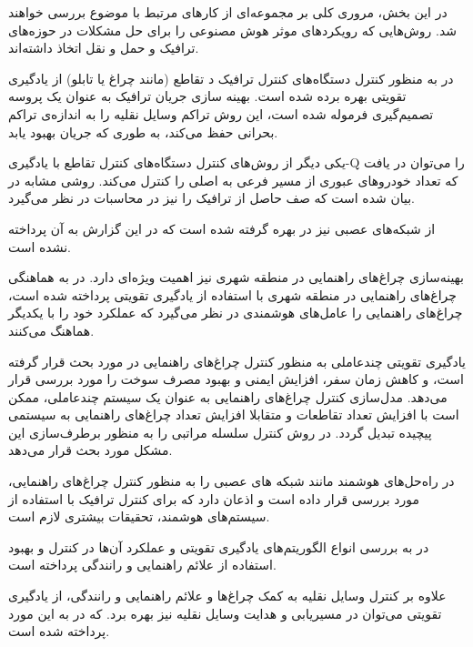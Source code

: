 

در این بخش، مروری کلی بر مجموعه‌ای از کارهای مرتبط با موضوع بررسی خواهند شد. روش‌هایی که رویکردهای موثر هوش مصنوعی را برای حل مشکلات در حوزه‌های ترافیک و حمل و نقل اتخاذ داشته‌اند.

در \cite{Fares2014} به منظور کنترل دستگاه‌های کنترل ترافیک د تقاطع (مانند چراغ یا تابلو) از یادگیری تقویتی بهره برده شده است. 
بهینه سازی جریان ترافیک به عنوان یک پروسه تصمیم‌گیری فرموله شده است، این روش تراکم وسایل نقلیه را به اندازه‌ی تراکم بحرانی حفظ می‌کند، به طوری که جریان بهبود یابد.

یکی دیگر از روش‌های کنترل دستگاه‌های کنترل تقاطع با یادگیری-Q را می‌توان در \cite{Rezaee2012} یافت که تعداد خودروهای عبوری از مسیر فرعی به اصلی را کنترل می‌کند.
روشی مشابه در \cite{Davarynejad2011} بیان شده است که صف حاصل از ترافیک را نیز در محاسبات در نظر می‌گیرد.

از شبکه‌های عصبی نیز در \cite{Wei2002} بهره گرفته شده است که در این گزارش به آن پرداخته نشده است.

بهینه‌سازی چراغ‌های راهنمایی در منطقه شهری نیز اهمیت ویژه‌ای دارد. در \cite{Kuyer2008} به هماهنگی چراغ‌های راهنمایی در منطقه شهری با استفاده از یادگیری تقویتی پرداخته شده است، چراغ‌های راهنمایی را عامل‌های هوشمندی در نظر می‌گیرد که عملکرد خود را با یکدیگر هماهنگ می‌کنند. 

یادگیری تقویتی چندعاملی به منظور کنترل چراغ‌های راهنمایی در \cite{Khamis2014,Khamis2012} مورد بحث قرار گرفته است، و کاهش زمان سفر، افزایش ایمنی و بهبود مصرف سوخت را مورد بررسی قرار می‌دهد. مدل‌سازی کنترل چراغ‌های راهنمایی به عنوان یک سیستم چندعاملی، ممکن است با افزایش تعداد تقاطعات و متقابلا افزایش تعداد چراغ‌های راهنمایی به سیستمی پیچیده تبدیل گردد. در \cite{Abdoos2013} روش کنترل سلسله مراتبی را به منظور برطرف‌سازی این مشکل مورد بحث قرار می‌دهد.

در \cite{Zhao2012} راه‌حل‌های هوشمند مانند شبکه های عصبی را به منظور کنترل چراغ‌های راهنمایی،  مورد بررسی قرار داده است و اذعان دارد که برای کنترل ترافیک با استفاده از سیستم‌های هوشمند، تحقیقات بیشتری لازم است.

در \cite{Yau2017} به بررسی انواع الگوریتم‌های یادگیری تقویتی و عملکرد آن‌ها در کنترل و بهبود استفاده از علائم راهنمایی و رانندگی پرداخته است.

علاوه بر کنترل وسایل نقلیه به کمک چراغ‌ها و علائم راهنمایی و رانندگی، از یادگیری تقویتی می‌توان در مسیریابی و هدایت وسایل نقلیه نیز بهره برد. که در \cite{Zolfpour-Arokhlo2014} به این مورد پرداخته شده است.



